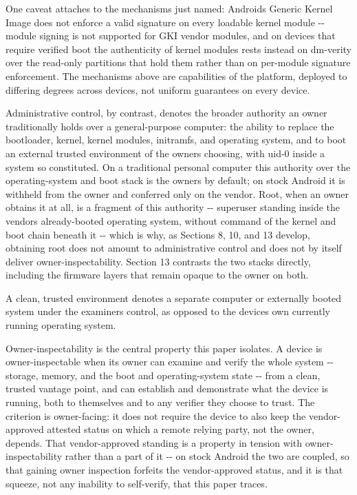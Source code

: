 \documentclass[
]{article}
\begin{document}
One caveat attaches to the mechanisms just named:
Android\textquotesingle s Generic Kernel Image does not enforce a valid
signature on every loadable kernel module -\/- module signing is not
supported for GKI vendor modules, and on devices that require verified
boot the authenticity of kernel modules rests instead on dm-verity over
the read-only partitions that hold them
\citep{aosp-loadable-kernel-modules} rather than on per-module signature
enforcement. The mechanisms above are capabilities of the platform,
deployed to differing degrees across devices, not uniform guarantees on
every device.

Administrative control, by contrast, denotes the broader authority an
owner traditionally holds over a general-purpose computer: the ability
to replace the bootloader, kernel, kernel modules, initramfs, and
operating system, and to boot an external trusted environment of the
owner\textquotesingle s choosing, with uid-0 inside a system so
constituted. On a traditional personal computer this authority over the
operating-system and boot stack is the owner\textquotesingle s by
default; on stock Android it is withheld from the owner and conferred
only on the vendor. Root, when an owner obtains it at all, is a fragment
of this authority -\/- superuser standing inside the
vendor\textquotesingle s already-booted operating system, without
command of the kernel and boot chain beneath it -\/- which is why, as
Sections 8, 10, and 13 develop, obtaining root does not amount to
administrative control and does not by itself deliver
owner-inspectability. Section 13 contrasts the two stacks directly,
including the firmware layers that remain opaque to the owner on both.

A clean, trusted environment denotes a separate computer or externally
booted system under the examiner\textquotesingle s control, as opposed
to the device\textquotesingle s own currently running operating system.

Owner-inspectability is the central property this paper isolates. A
device is owner-inspectable when its owner can examine and verify the
whole system -\/- storage, memory, and the boot and operating-system
state -\/- from a clean, trusted vantage point, and can establish and
demonstrate what the device is running, both to themselves and to any
verifier they choose to trust. The criterion is owner-facing: it does
not require the device to also keep the vendor-approved attested status
on which a remote relying party, not the owner, depends. That
vendor-approved standing is a property in tension with
owner-inspectability rather than a part of it -\/- on stock Android the
two are coupled, so that gaining owner inspection forfeits the
vendor-approved status, and it is that squeeze, not any inability to
self-verify, that this paper traces.
\end{document}
